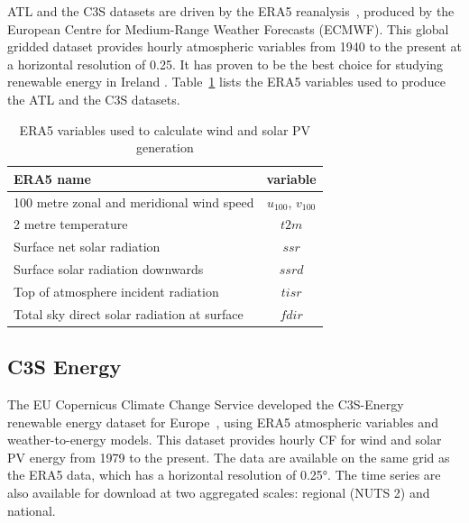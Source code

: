 \documentclass[preprint, 12pt]{elsarticle}
\begin{document}
ATL and the C3S datasets are driven by the ERA5 reanalysis~\citep{hersbach2020era5}, produced by the European Centre for Medium-Range Weather Forecasts (ECMWF). This global gridded dataset provides hourly atmospheric variables from 1940 to the present at a horizontal resolution of 0.25\textdegree. It has proven to be the best choice for studying renewable energy in Ireland \citep{doddy2021era5}. Table~\ref{tab:var_name} lists the ERA5 variables used to produce the ATL and the C3S datasets.

\begin{table}[h!]
	\centering
	\caption{ERA5 variables used to calculate wind and solar PV generation}
	\begin{tabular}{|l|c|}
		\hline
		{\textbf{ERA5 name}}      & \textbf{variable} \\ \hline
		100 metre zonal and meridional wind speed   & $u_{100}$, $v_{100}$ \\
		2 metre temperature                         & $t2m$ \\
		Surface net solar radiation                 & $ssr$ \\
		Surface solar radiation downwards           & $ssrd$  \\
		Top of atmosphere incident radiation        & $tisr$  \\
		Total sky direct solar radiation at surface & $fdir$  \\ \hline
	\end{tabular}
	\label{tab:var_name}
\end{table}

\subsection{C3S Energy}
\label{sec:c3se}

The EU Copernicus Climate Change Service developed the C3S-Energy renewable energy dataset for Europe~\citep{dubus2023energy}, using ERA5 atmospheric variables and weather-to-energy models. This dataset provides hourly CF for wind and solar PV energy from 1979 to the present. The data are available on the same grid as the ERA5 data, which has a horizontal resolution of 0.25°. The time series are also available for download at two aggregated scales: regional (NUTS 2) and national.
\end{document}
